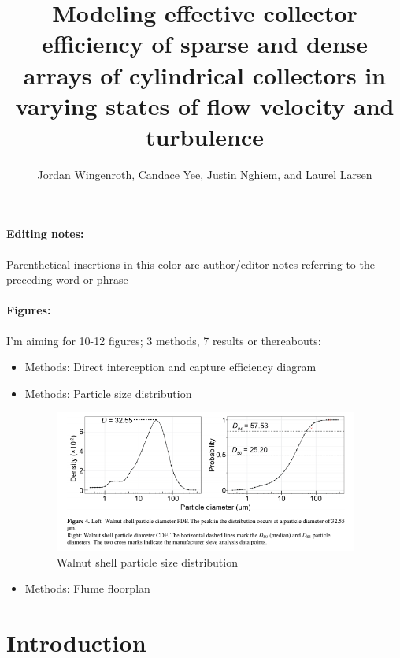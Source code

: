 \documentclass[10pt,a4paper]{article}
\author{Jordan Wingenroth, Candace Yee, Justin Nghiem, and Laurel Larsen}
\title{Modeling effective collector efficiency of sparse and dense arrays of cylindrical collectors in varying states of flow velocity and turbulence}
\begin{document}
\maketitle



\paragraph{Editing notes:} 

\textcolor{red!75!green}{Parenthetical insertions in this color are author/editor notes referring to the preceding word or phrase}



\paragraph{Figures:}

I'm aiming for 10-12 figures; 3 methods, 7 results or thereabouts:

\begin{itemize}

\item Methods: Direct interception and capture efficiency diagram

\item Methods: Particle size distribution

\begin{figure}[h]
\includegraphics[width=10cm]{wf5-200sizedist.png}
\centering
\caption{Walnut shell particle size distribution}
\end{figure}

\item Methods: Flume floorplan

\end{itemize}



\section{Introduction}
\end{document}
